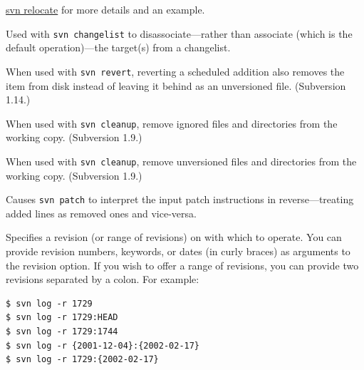 \begin{description}
\hyperref[svn.ref.svn.c.relocate]{svn relocate} for more details and an
example.
\item[\protect\phantomsection\label{svn.ref.svn.sw.remove}{}\texttt{-\/-remove}]
Used with \texttt{svn\ changelist} to disassociate---rather than
associate (which is the default operation)---the target(s) from a
changelist.
\item[\protect\phantomsection\label{svn.ref.svn.sw.remove_added}{}\texttt{-\/-remove-added}]
When used with \texttt{svn\ revert}, reverting a scheduled addition also
removes the item from disk instead of leaving it behind as an unversioned
file. (Subversion 1.14.)
\item[\protect\phantomsection\label{svn.ref.svn.sw.remove_ignored}{}\texttt{-\/-remove-ignored}]
When used with \texttt{svn\ cleanup}, remove ignored files and
directories from the working copy. (Subversion 1.9.)
\item[\protect\phantomsection\label{svn.ref.svn.sw.remove_unversioned}{}\texttt{-\/-remove-unversioned}]
When used with \texttt{svn\ cleanup}, remove unversioned files and
directories from the working copy. (Subversion 1.9.)
\item[\protect\phantomsection\label{svn.ref.svn.sw.reverse_diff}{}\texttt{-\/-reverse-diff}]
Causes \texttt{svn\ patch} to interpret the input patch instructions in
reverse---treating added lines as removed ones and vice-versa.
\item[\protect\phantomsection\label{svn.ref.svn.sw.revision}{}\texttt{-\/-revision}
(\texttt{-r}) \textless REV\textgreater{}]
Specifies a revision (or range of revisions) on with which to operate.
You can provide revision numbers, keywords, or dates (in curly braces)
as arguments to the revision option. If you wish to offer a range of
revisions, you can provide two revisions separated by a colon. For
example:

\begin{verbatim}
$ svn log -r 1729
$ svn log -r 1729:HEAD
$ svn log -r 1729:1744
$ svn log -r {2001-12-04}:{2002-02-17}
$ svn log -r 1729:{2002-02-17}
\end{verbatim}


\end{description}
